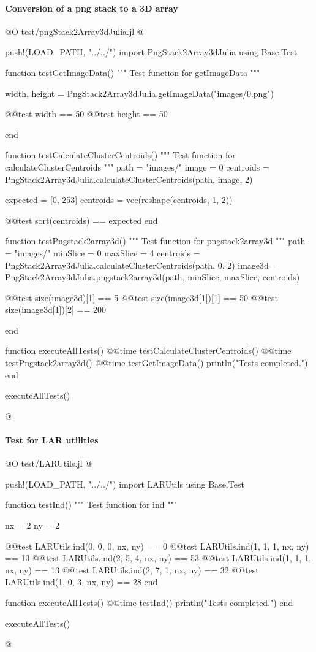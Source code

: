 \documentclass[11pt,oneside]{article}	%
\begin{document}
\paragraph{Conversion of a png stack to a 3D array}
@O test/pngStack2Array3dJulia.jl
@{push!(LOAD_PATH, "../../")
import PngStack2Array3dJulia
using Base.Test

function testGetImageData()
  """
  Test function for getImageData
  """

  width, height = PngStack2Array3dJulia.getImageData("images/0.png")

  @@test width == 50
  @@test height == 50

end

function testCalculateClusterCentroids()
  """
  Test function for calculateClusterCentroids
  """
  path = "images/"
  image = 0
  centroids = PngStack2Array3dJulia.calculateClusterCentroids(path, image, 2)

  expected = [0, 253]
  centroids = vec(reshape(centroids, 1, 2))

  @@test sort(centroids) == expected
end

function testPngstack2array3d()
  """
  Test function for pngstack2array3d
  """
  path = "images/"
  minSlice = 0
  maxSlice = 4
  centroids = PngStack2Array3dJulia.calculateClusterCentroids(path, 0, 2)
  image3d = PngStack2Array3dJulia.pngstack2array3d(path, minSlice, maxSlice, centroids)

  @@test size(image3d)[1] == 5
  @@test size(image3d[1])[1] == 50
  @@test size(image3d[1])[2] == 200

end

function executeAllTests()
  @@time testCalculateClusterCentroids()
  @@time testPngstack2array3d()
  @@time testGetImageData()
  println("Tests completed.")
end

executeAllTests()

@}

\paragraph{Test for LAR utilities}
@O test/LARUtils.jl
@{push!(LOAD_PATH, "../../")
import LARUtils
using Base.Test

function testInd()
  """
  Test function for ind
  """

  nx = 2
  ny = 2

  @@test LARUtils.ind(0, 0, 0, nx, ny) == 0
  @@test LARUtils.ind(1, 1, 1, nx, ny) == 13
  @@test LARUtils.ind(2, 5, 4, nx, ny) == 53
  @@test LARUtils.ind(1, 1, 1, nx, ny) == 13
  @@test LARUtils.ind(2, 7, 1, nx, ny) == 32
  @@test LARUtils.ind(1, 0, 3, nx, ny) == 28
end

function executeAllTests()
  @@time testInd()
  println("Tests completed.")
end

executeAllTests()

@}
\end{document}
